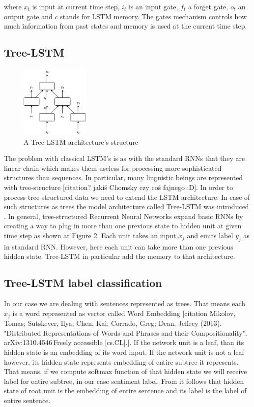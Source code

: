 \documentclass[10pt, a4paper]{article}
\begin{document}
		where $x_t$ is input at current time step, $i_t$ is an input gate, $f_t$ a forget gate, $o_t$ an output gate and $c$ stands for LSTM memory.
		The gates mechanism controls how much information from past states and memory is used at the current time step. 

\subsection{Tree-LSTM}
\begin{figure}[h]
	\begin{center}
		\includegraphics[width=0.3\textwidth]{imgs/tree-lstm}
		\caption{A Tree-LSTM architecture's structure}
		\label{tab:tree-lstm}
	\end{center}
\end{figure}
	The problem with classical LSTM's is as with the standard RNNs that they are linear chain which makes them useless for processing more sophisticated structures than sequences. In particular, many linguistic beings are represented with tree-structure [citation? jakiś Chomsky czy coś fajnego :D].
	In order to process tree-structured data we need to extend the LSTM architecture. In case of such structures as trees the model architecture called Tree-LSTM was introduced \cite{tai2015improved}.
	In general, tree-structured Recurrent Neural Networks expand basic RNNs by creating a way to plug in more than one previous state to hidden unit at given time step as shown at Figure 2.
	Each unit takes an input $x_j$ and emits label $y_j$ as in standard RNN. However, here each unit can take more than one previous hidden state. Tree-LSTM in particular add the memory to that architecture.
	
\subsection{Tree-LSTM label classification}
		In our case we are dealing with sentences represented as trees. That means each $x_j$ is a word represented as vector called Word Embedding
		[citation  Mikolov, Tomas; Sutskever, Ilya; Chen, Kai; Corrado, Greg; Dean, Jeffrey (2013). "Distributed Representations of Words and Phrases and their Compositionality". arXiv:1310.4546 Freely accessible [cs.CL].]. If the network unit is a leaf, than its hidden state is an embedding of its word input. If the network unit is not a leaf however, its hidden state represents embedding of entire subtree it represents. That means, if we compute softmax function of that hidden state we will receive label for entire subtree, in our case sentiment label. From it follows that hidden state of root unit is the embedding of entire sentence and its label is the label of entire sentence.\\
	\indent
	
\end{document}
